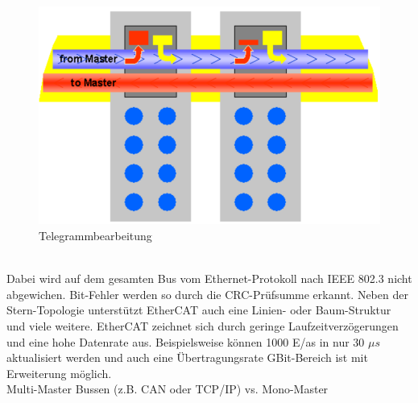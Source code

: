 \documentclass[ a4paper,
                oneside,
                toc=bibliography,
                toc=listof
                ]{scrbook}
\begin{document}
	\begin{figure}[!ht]
		\centering
		\includegraphics[width=0.7\linewidth]{./images/EtherCAT.png}
		\caption{Telegrammbearbeitung \cite{ethercat}}
		\label{fig:EtherCAT}
	\end{figure}\\
	Dabei wird auf dem gesamten Bus vom Ethernet-Protokoll nach IEEE 802.3 nicht abgewichen. Bit-Fehler werden so durch die CRC-Prüfsumme erkannt. Neben der Stern-Topologie unterstützt EtherCAT auch eine Linien- oder Baum-Struktur und viele weitere.
	EtherCAT zeichnet sich durch geringe Laufzeitverzögerungen und eine hohe Datenrate aus. Beispielsweise können 1000 E/as in nur 30 \(\mu s\) aktualisiert werden und auch eine Übertragungsrate GBit-Bereich ist mit Erweiterung möglich. \cite{ethercat}\\
	\label{subsec:EthernetFeldbus}
	Multi-Master Bussen (z.B. CAN oder TCP/IP) vs. Mono-Master
	
\end{document}
